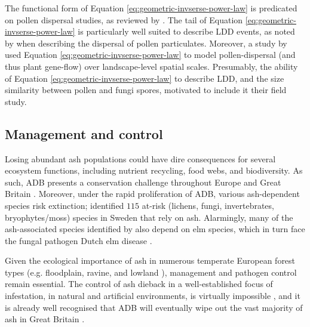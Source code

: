 The functional form of Equation \ref{eq:geometric-invserse-power-law} is predicated on pollen dispersal studies,
as reviewed by \cite{nathan2012dispersal}. The tail of Equation \ref{eq:geometric-invserse-power-law} is 
particularly well suited to describe LDD events, as noted by \cite{https://doi.org/10.1111/j.1365-294X.2004.02100.x}
when describing the dispersal of pollen particulates. Moreover, a study by \cite{https://doi.org/10.1111/j.1365-294X.2006.03155.x}
used Equation \ref{eq:geometric-invserse-power-law} to model pollen-dispersal (and thus plant gene-flow) over landscape-level spatial scales. 
Presumably, the ability of Equation \ref{eq:geometric-invserse-power-law} to describe LDD, and the size similarity between pollen and fungi spores, 
motivated \cite{grosdidier2018tracking} to include it their field study. 

\subsection{Management and control}

Losing abundant ash populations could have dire consequences for several ecosystem functions, including nutrient recycling, food webs, and biodiversity.
As such, ADB presents a conservation challenge throughout Europe and Great Britain \cite{pautasso2013european}. Moreover, under the rapid proliferation of ADB, various ash-dependent species risk extinction; \cite{hultberg2020ash} identified $115$ at-risk (lichens, fungi, invertebrates, bryophytes/moss) species in Sweden that rely on ash.
Alarmingly, many of the ash-associated species identified by \cite{hultberg2020ash} also depend on elm species, which in turn face the fungal pathogen Dutch elm disease \cite{brasier1991ophiostoma}.

Given the ecological importance of ash in numerous temperate European forest types (e.g. floodplain, ravine, 
and lowland \cite{dobrowolska2011review}), management and pathogen control remain essential. The control of ash dieback in a well-established focus of infestation, in natural and artificial environments, is virtually impossible \cite{havrdova2017environmental}, and it is already well recognised that ADB will eventually wipe out the vast majority of ash in Great Britain \cite{ash-dieback-costs}.

